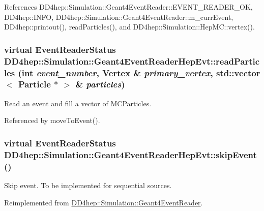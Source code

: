 References DD4hep::Simulation::Geant4EventReader::EVENT\_\-READER\_\-OK, DD4hep::INFO, DD4hep::Simulation::Geant4EventReader::m\_\-currEvent, DD4hep::printout(), readParticles(), and DD4hep::Simulation::HepMC::vertex().\hypertarget{class_d_d4hep_1_1_simulation_1_1_geant4_event_reader_hep_evt_a33f1a507c2567df42f14616d6724727a}{
\subsubsection[{readParticles}]{\setlength{\rightskip}{0pt plus 5cm}virtual {\bf EventReaderStatus} DD4hep::Simulation::Geant4EventReaderHepEvt::readParticles (int {\em event\_\-number}, \/  {\bf Vertex} \& {\em primary\_\-vertex}, \/  std::vector$<$ {\bf Particle} $\ast$ $>$ \& {\em particles})}}
\label{class_d_d4hep_1_1_simulation_1_1_geant4_event_reader_hep_evt_a33f1a507c2567df42f14616d6724727a}


Read an event and fill a vector of MCParticles. 

Referenced by moveToEvent().\hypertarget{class_d_d4hep_1_1_simulation_1_1_geant4_event_reader_hep_evt_a643c4f3e44964b0a5692b5b169ada9e6}{
\subsubsection[{skipEvent}]{\setlength{\rightskip}{0pt plus 5cm}virtual {\bf EventReaderStatus} DD4hep::Simulation::Geant4EventReaderHepEvt::skipEvent ()}}
\label{class_d_d4hep_1_1_simulation_1_1_geant4_event_reader_hep_evt_a643c4f3e44964b0a5692b5b169ada9e6}


Skip event. To be implemented for sequential sources. 

Reimplemented from \hyperlink{class_d_d4hep_1_1_simulation_1_1_geant4_event_reader_a9381626ad4f4fa20e304414f6654ee03}{DD4hep::Simulation::Geant4EventReader}.

